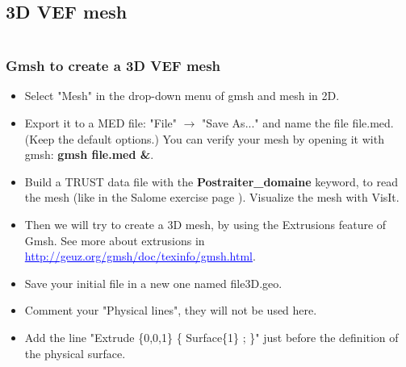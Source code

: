 \documentclass[10pt, hyperref={unicode=true,pdfusetitle, bookmarks=true,bookmarksnumbered=false,bookmarksopen=false, breaklinks=false,pdfborder={0 0 1},backref=true,colorlinks=true,linkcolor=darkblue,pageanchor}]{beamer}
\begin{document}
\subsection{3D VEF mesh}
\begin{frame}
\begin{small}
\begin{columns}[c] 
\tableofcontents[sections={1-9},currentsection, currentsubsection]
\tableofcontents[sections={10-16},currentsection, currentsubsection]
\end{columns}
\end{small}
\end{frame}
\begin{frame}
\frametitle{Gmsh to create a 3D VEF mesh}
\begin{block}{}

\begin{itemize}
\item Select "Mesh" in the drop-down menu of gmsh and mesh in 2D.
\item Export it to a MED file: "File" $\rightarrow$ "Save As..." and name the file file.med. (Keep the default options.) You can verify your mesh by opening it with gmsh: \textbf{gmsh file.med \&}.
\item Build a TRUST data file with the \textbf{Postraiter\_domaine} keyword, to read the mesh (like in the Salome exercise page \pageref{read_mesh}). Visualize the mesh with VisIt.
\item Then we will try to create a 3D mesh, by using the Extrusions feature of Gmsh. See more about extrusions in \textcolor{blue}{\underline{http://geuz.org/gmsh/doc/texinfo/gmsh.html}}.
\item Save your initial file in a new one named file3D.geo.
\item Comment your "Physical lines", they will not be used here.
\item Add the line "Extrude \{0,0,1\} \{ Surface\{1\} ; \}" just before the definition of the physical surface.
\end{itemize}

\end{block}
\end{frame}
\end{document}
